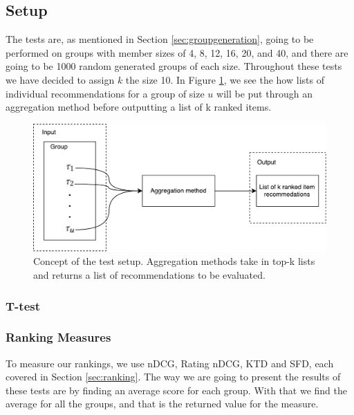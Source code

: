 \subsection{Setup}\label{sec:setup}
The tests are, as mentioned in Section \ref{sec:groupgeneration}, going to be performed on groups with member sizes of 4, 8, 12, 16, 20, and 40, and there are going to be 1000 random generated groups of each size. Throughout these tests we have decided to assign $k$ the size 10. In Figure \ref{fig:setup}, we see the how lists of individual recommendations for a group of size $u$ will be put through an aggregation method before outputting a list of k ranked items.
\begin{figure}[h]
	\centering
	\includegraphics[scale=.4]{graphics/setup}
	\caption{Concept of the test setup. Aggregation methods take in top-k lists and returns a list of recommendations to be evaluated.}
	\label{fig:setup}
\end{figure}
\subsubsection{T-test}

\subsubsection{Ranking Measures}
To measure our rankings, we use nDCG, Rating nDCG, KTD and SFD, each covered in Section \ref{sec:ranking}. The way we are going to present the results of these tests are by finding an average score for each group. With that we find the average for all the groups, and that is the returned value for the measure.